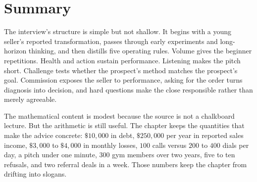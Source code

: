 \section{Summary}

The interview's structure is simple but not shallow. It begins with a young seller's reported transformation, passes through early experiments and long-horizon thinking, and then distills five operating rules. Volume gives the beginner repetitions. Health and action sustain performance. Listening makes the pitch short. Challenge tests whether the prospect's method matches the prospect's goal. Commission exposes the seller to performance, asking for the order turns diagnosis into decision, and hard questions make the close responsible rather than merely agreeable.

The mathematical content is modest because the source is not a chalkboard lecture. But the arithmetic is still useful. The chapter keeps the quantities that make the advice concrete: \(\$10{,}000\) in debt, \(\$250{,}000\) per year in reported sales income, \(\$3{,}000\) to \(\$4{,}000\) in monthly losses, \(100\) calls versus \(200\) to \(400\) dials per day, a pitch under one minute, \(300\) gym members over two years, five to ten refusals, and two referral deals in a week. Those numbers keep the chapter from drifting into slogans.